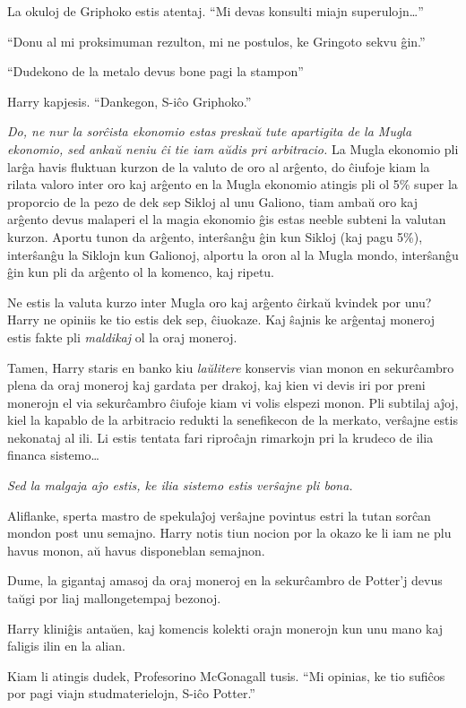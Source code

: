 La okuloj de Griphoko estis atentaj. ``Mi devas konsulti miajn
superulojn\ldots''

``Donu al mi proksimuman rezulton, mi ne postulos, ke Gringoto sekvu
ĝin.''

``Dudekono de la metalo devus bone pagi la stampon''

Harry kapjesis. ``Dankegon, S-iĉo Griphoko.''

\emph{Do, ne nur la sorĉista ekonomio estas preskaŭ tute apartigita de
  la Mugla ekonomio, sed ankaŭ neniu ĉi tie iam aŭdis pri arbitracio.}
La Mugla ekonomio pli larĝa havis fluktuan kurzon de la valuto de oro
al arĝento, do ĉiufoje kiam la rilata valoro inter oro kaj arĝento en
la Mugla ekonomio atingis pli ol 5\% super la proporcio de la pezo de
dek sep Sikloj al unu Galiono, tiam ambaŭ oro kaj arĝento devus
malaperi el la magia ekonomio ĝis estas neeble subteni la valutan
kurzon. Aportu tunon da arĝento, interŝanĝu ĝin kun Sikloj (kaj pagu
5\%), interŝanĝu la Siklojn kun Galionoj, alportu la oron al la Mugla
mondo, interŝanĝu ĝin kun pli da arĝento ol la komenco, kaj ripetu.

Ne estis la valuta kurzo inter Mugla oro kaj arĝento ĉirkaŭ kvindek
por unu? Harry ne opiniis ke tio estis dek sep, ĉiuokaze. Kaj ŝajnis
ke arĝentaj moneroj estis fakte pli \emph{maldikaj} ol la oraj
moneroj.

Tamen, Harry staris en banko kiu \emph{laŭlitere} konservis vian monon
en sekurĉambro plena da oraj moneroj kaj gardata per drakoj, kaj kien
vi devis iri por preni monerojn el via sekurĉambro ĉiufoje kiam vi
volis elspezi monon. Pli subtilaj aĵoj, kiel la kapablo de la
arbitracio redukti la senefikecon de la merkato, verŝajne estis
nekonataj al ili. Li estis tentata fari riproĉajn rimarkojn pri la
krudeco de ilia financa sistemo\ldots

\emph{Sed la malgaja aĵo estis, ke ilia sistemo estis verŝajne pli
bona.}

Aliflanke, sperta mastro de spekulaĵoj verŝajne povintus estri la tutan
sorĉan mondon post unu semajno. Harry notis tiun nocion por la okazo ke
li iam ne plu havus monon, aŭ havus disponeblan semajnon.

Dume, la gigantaj amasoj da oraj moneroj en la sekurĉambro de
Potter'j devus taŭgi por liaj mallongetempaj bezonoj.

Harry kliniĝis antaŭen, kaj komencis kolekti orajn monerojn kun
unu mano kaj faligis ilin en la alian.

Kiam li atingis dudek, Profesorino McGonagall tusis. ``Mi opinias, ke
tio sufiĉos por pagi viajn studmaterielojn, S-iĉo Potter.''


